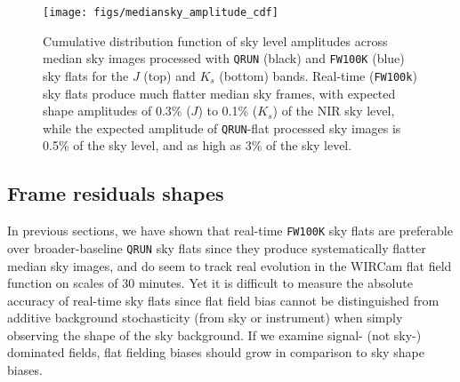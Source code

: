 \documentclass[iop]{emulateapj}
\begin{document}
\begin{figure}[t]
\centering
\texttt{[image: figs/mediansky\_amplitude\_cdf]}
\caption{Cumulative distribution function of sky level amplitudes across median sky images processed with \texttt{QRUN} (black) and \texttt{FW100K} (blue) sky flats for the $J$ (top) and $K_s$ (bottom) bands. Real-time (\texttt{FW100k}) sky flats produce much flatter median sky frames, with expected shape amplitudes of 0.3\% ($J$) to 0.1\% ($K_s$) of the NIR sky level, while the expected amplitude of \texttt{QRUN}-flat processed sky images is 0.5\% of the sky level, and as high as 3\% of the sky level.
}
\label{fig:mediansky_amplitude}
\end{figure}

\subsection{Frame residuals shapes}
\label{sec:frameblockresiduals}

In previous sections, we have shown that real-time \texttt{FW100K} sky flats are preferable over broader-baseline \texttt{QRUN} sky flats since they produce systematically flatter median sky images, and do seem to track real evolution in the WIRCam flat field function on scales of 30 minutes.
Yet it is difficult to measure the absolute accuracy of real-time sky flats since flat field bias cannot be distinguished from additive background stochasticity (from sky or instrument) when simply observing the shape of the sky background.
If we examine signal- (not sky-) dominated fields, flat fielding biases should grow in comparison to sky shape biases.
\end{document}
